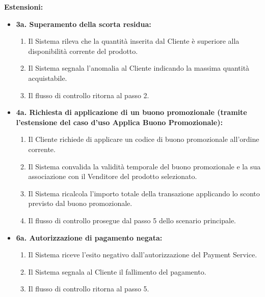 \textbf{Estensioni:}
\begin{itemize}
    \item \textbf{3a. Superamento della scorta residua:}
    \begin{enumerate}
        \item Il Sistema rileva che la quantità inserita dal Cliente è superiore alla disponibilità corrente del prodotto.
        \item Il Sistema segnala l'anomalia al Cliente indicando la massima quantità acquistabile.
        \item Il flusso di controllo ritorna al passo 2.
    \end{enumerate}
    \item \textbf{4a. Richiesta di applicazione di un buono promozionale (tramite l'estensione del caso d'uso Applica Buono Promozionale):}
    \begin{enumerate}
        \item Il Cliente richiede di applicare un codice di buono promozionale all'ordine corrente.
        \item Il Sistema convalida la validità temporale del buono promozionale e la sua associazione con il Venditore del prodotto selezionato.
        \item Il Sistema ricalcola l'importo totale della transazione applicando lo sconto previsto dal buono promozionale.
        \item Il flusso di controllo prosegue dal passo 5 dello scenario principale.
    \end{enumerate}
    \item \textbf{6a. Autorizzazione di pagamento negata:}
    \begin{enumerate}
        \item Il Sistema riceve l'esito negativo dall'autorizzazione del Payment Service.
        \item Il Sistema segnala al Cliente il fallimento del pagamento.
        \item Il flusso di controllo ritorna al passo 5.
    \end{enumerate}
\end{itemize}

